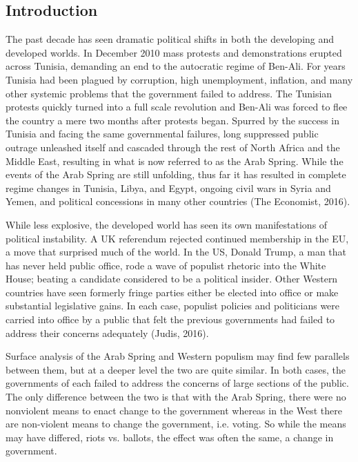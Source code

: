 \documentclass[12pt]{article}
\begin{document}
\begin{spacing}{1.5}


\section{Introduction}

The past decade has seen dramatic political shifts in both the developing and developed worlds. In December 2010 mass protests and demonstrations erupted across Tunisia, demanding an end to the autocratic regime of Ben-Ali. For years Tunisia had been plagued by corruption, high unemployment, inflation, and many other systemic problems that the government failed to address. The Tunisian protests quickly turned into a full scale revolution and Ben-Ali was forced to flee the country a mere two months after protests began. Spurred by the success in Tunisia and facing the same governmental failures, long suppressed public outrage unleashed itself and cascaded through the rest of North Africa and the Middle East, resulting in what is now referred to as the Arab Spring. While the events of the Arab Spring are still unfolding, thus far it has resulted in complete regime changes in Tunisia, Libya, and Egypt, ongoing civil wars in Syria and Yemen, and political concessions in many other countries (The Economist, 2016).  

While less explosive, the developed world has seen its own manifestations of political instability. A UK referendum rejected continued membership in the EU, a move that surprised much of the world. In the US, Donald Trump, a man that has never held public office, rode a wave of populist rhetoric into the White House; beating a candidate considered to be a political insider. Other Western countries have seen formerly fringe parties either be elected into office or make substantial legislative gains. In each case, populist policies and politicians were carried into office by a public that felt the previous governments had failed to address their concerns adequately (Judis, 2016).

Surface analysis of the Arab Spring and Western populism may find few parallels between them, but at a deeper level the two are quite similar. In both cases, the governments of each failed to address the concerns of large sections of the public. The only difference between the two is that with the Arab Spring, there were no nonviolent means to enact change to the government whereas in the West there are non-violent means to change the government, i.e. voting. So while the means may have differed, riots vs. ballots, the effect was often the same, a change in government.  


\end{spacing}
\end{document}
